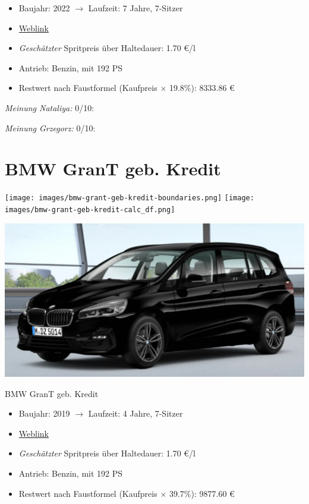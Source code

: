 \documentclass[landscape, DIV=99, 14pt]{scrartcl}
\begin{document}
\begin{itemize}
    \item Baujahr: 2022 $\rightarrow$ Laufzeit: 7 Jahre, 7-Sitzer
    \item \href{https://mulfinger.de/de/fahrzeugangebot/BMW/220i-GranTourer-Sport-DKG-HUD-LED-ParkAssNavi/page1/details-p5clkem9?manufacturer=5&model=2534&view=list}{Weblink}
    \item \emph{Gesch\"atzter} Spritpreis \"uber Haltedauer: 1.70 \euro{}/l
    \item Antrieb: Benzin, mit 192 PS
    \item Restwert nach Faustformel (Kaufpreis $\times$ 19.8\%): 8333.86 \euro{}
\end{itemize}

\begin{small}
\emph{Meinung Nataliya:} 0/10: 
        
\emph{Meinung Grzegorz:} 0/10: 
\end{small}

\pagebreak


\twocolumn

\section*{BMW GranT geb. Kredit}
\begin{center}
\texttt{[image: images/bmw-grant-geb-kredit-boundaries.png]}
\null
\vspace{0.5cm}
\texttt{[image: images/bmw-grant-geb-kredit-calc\_df.png]}
\end{center}

\pagebreak
\begin{center}
\includegraphics[width=0.9\columnwidth]{cars/bmw-gran-tourer-mulfinger.png}

BMW GranT geb. Kredit
\end{center}

\begin{itemize}
    \item Baujahr: 2019 $\rightarrow$ Laufzeit: 4 Jahre, 7-Sitzer
    \item \href{https://mulfinger.de/de/fahrzeugangebot/BMW/220i-GranTourer-Sport-DKG-HUD-LED-ParkAssNavi/page1/details-p5clkem9?manufacturer=5&model=2534&view=list}{Weblink}
    \item \emph{Gesch\"atzter} Spritpreis \"uber Haltedauer: 1.70 \euro{}/l
    \item Antrieb: Benzin, mit 192 PS
    \item Restwert nach Faustformel (Kaufpreis $\times$ 39.7\%): 9877.60 \euro{}
\end{itemize}
\end{document}
